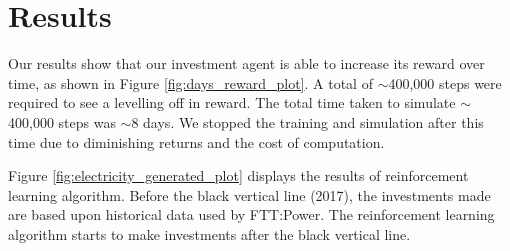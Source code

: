 \documentclass{article}
\begin{document}




%



\section{Results}
\label{sec:results}


%

Our results show that our investment agent is able to increase its reward over time, as shown in Figure \ref{fig:days_reward_plot}. A total of ${\sim}$400,000 steps were required to see a levelling off in reward. The total time taken to simulate ${\sim}$400,000 steps was ${\sim}$8 days. We stopped the training and simulation after this time due to diminishing returns and the cost of computation.

Figure \ref{fig:electricity_generated_plot} displays the results of reinforcement learning algorithm. Before the black vertical line (2017), the investments made are based upon historical data used by FTT:Power. The reinforcement learning algorithm starts to make investments after the black vertical line. 
\end{document}
